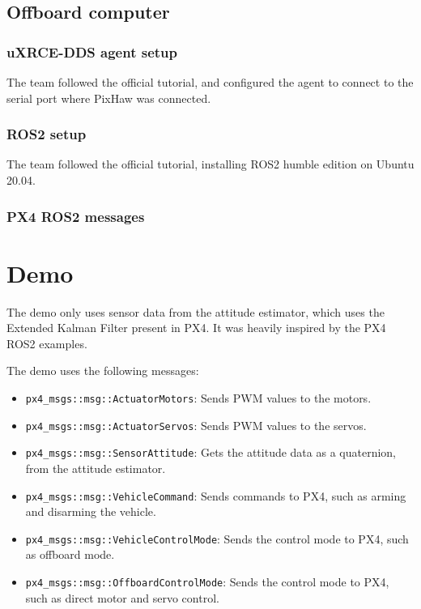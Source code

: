 \documentclass[a4paper]{article}
\begin{document}
\subsection{Offboard computer}

\subsubsection{uXRCE-DDS agent setup}

The team followed the official tutorial, and configured the agent to connect to the serial port where PixHaw was connected.

\subsubsection{ROS2 setup}

The team followed the official tutorial, installing ROS2 humble edition on Ubuntu 20.04. 


\subsubsection{PX4 ROS2 messages}





\section{Demo}

The demo only uses sensor data from the attitude estimator, which uses the Extended Kalman Filter present in PX4. 
It was heavily inspired by the PX4 ROS2 examples. 

The demo uses the following messages: 

\begin{itemize}
    \item \verb|px4_msgs::msg::ActuatorMotors|: Sends PWM values to the motors.
    \item \verb|px4_msgs::msg::ActuatorServos|: Sends PWM values to the servos.
    \item \verb|px4_msgs::msg::SensorAttitude|: Gets the attitude data as a quaternion, from the attitude estimator.
    \item \verb|px4_msgs::msg::VehicleCommand|: Sends commands to PX4, such as arming and disarming the vehicle.
    \item \verb|px4_msgs::msg::VehicleControlMode|: Sends the control mode to PX4, such as offboard mode.
    \item \verb|px4_msgs::msg::OffboardControlMode|: Sends the control mode to PX4, such as direct motor and servo control.
\end{itemize}
\end{document}
